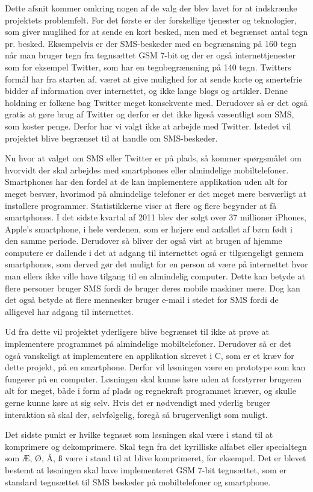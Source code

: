 Dette afsnit kommer omkring nogen af de valg der blev lavet for at indskrænke projektets problemfelt. For det første er der forskellige tjenester og teknologier, som giver muglihed for at sende en kort besked, men med et begrænset antal tegn pr. besked. Eksempelvis er der SMS-beskeder med en begrænsning på 160 tegn når man bruger tegn fra tegnsættet GSM 7-bit\cite{Pro_1} og der er også internettjenester som for eksempel Twitter, som har en tegnbegrænsning på 140 tegn\cite{pro_af1}. Twitters formål har fra starten af, været at give mulighed for at sende korte og smertefrie bidder af information over internettet, og ikke lange blogs og artikler. Denne holdning er folkene bag Twitter meget konsekvente med\cite{pro_af2}. Derudover så er det også gratis at gøre brug af Twitter og derfor er det ikke ligeså væsentligt som SMS, som koster penge. Derfor har vi valgt ikke at arbejde med Twitter. Istedet vil projektet blive begrænset til at handle om SMS-beskeder.

Nu hvor at valget om SMS eller Twitter er på plads, så kommer spørgsmålet om hvorvidt der skal arbejdes med smartphones eller almindelige mobiltelefoner. Smartphones har den fordel at de kan implementere applikation uden alt for meget besvær, hvorimod på almindelige telefoner er det meget mere besværligt at installere programmer. Statistikkerne viser at flere og flere begynder at få smartphones\cite{pro_af3}. I det sidste kvartal af 2011 blev der solgt over 37 millioner iPhones, Apple's smartphone, i hele verdenen, som er højere end antallet af børn født i den samme periode\cite{pro_af4}. Derudover så bliver der også vist at brugen af hjemme computere er dallende i det at adgang til internettet også er tilgængeligt gennem smartphones, som derved gør det muligt for en person at være på internettet hvor man ellers ikke ville have tilgang til en almindelig computer\cite{pro_af3}. Dette kan betyde at flere personer bruger SMS fordi de bruger deres mobile maskiner mere. Dog kan det også betyde at flere mennesker bruger e-mail i stedet for SMS fordi de alligevel har adgang til internettet. 

Ud fra dette vil projektet yderligere blive begrænset til ikke at prøve at implementere programmet på almindelige mobiltelefoner. Derudover så er det også vanskeligt at implementere en applikation skrevet i C, som er et kræv for dette projekt, på en smartphone. Derfor vil løsningen være en prototype som kan fungerer på en computer. Løsningen skal kunne køre uden at forstyrrer brugeren alt for meget, både i form af plads og regnekraft programmet kræver, og skulle gerne kunne køre at sig selv. Hvis det er nødvendigt med yderlig bruger interaktion så skal der, selvfølgelig, foregå så brugervenligt som muligt.

Det sidste punkt er hvilke tegnsæt som løsningen skal være i stand til at komprimere og dekomprimere. Skal tegn fra det kyrilliske alfabet eller specialtegn som Æ, Ø, Å, ß være i stand til at blive komprimeret, for eksempel. Det er blevet bestemt at løsningen skal have implementeret GSM 7-bit tegnsættet, som er standard tegnsættet til SMS beskeder på mobiltelefoner og smartphone.
